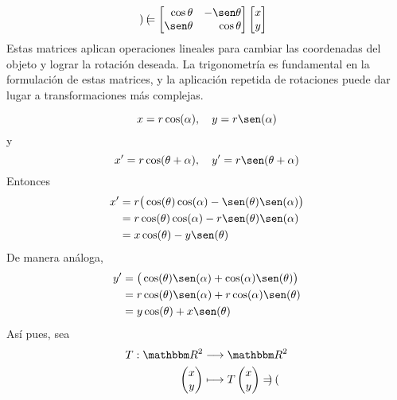 \begin{example}
{\begin{center}
{{$$\begin{pmatrix}
            \end{pmatrix} = \begin{bmatrix*}[r]
                \cos \theta & - \sen \theta \\
                \sen \theta & \cos \theta
            \end{bmatrix*} \begin{bmatrix}
                x \\
                y
            \end{bmatrix}$$
            Estas matrices aplican operaciones lineales para cambiar las coordenadas del objeto y lograr la rotación deseada. La trigonometría es fundamental en la formulación de estas matrices, y la aplicación repetida de rotaciones puede dar lugar a transformaciones más complejas.
        }}
    \end{center}
    }
    \begin{equation}
        x = r \cos(\alpha), \quad y = r \sen(\alpha)
    \end{equation}
    y
    \begin{equation}
        x' = r \cos(\theta + \alpha), \quad y' = r \sen(\theta + \alpha)
    \end{equation}
    Entonces
    \begin{align*}
        x' & = r \big( \cos(\theta) \cos(\alpha) - \sen(\theta) \sen(\alpha) \big) \\
        & = r \cos(\theta) \cos(\alpha) - r \sen(\theta) \sen(\alpha) \\
        & = x \cos(\theta) - y \sen(\theta)
    \end{align*}
    De manera análoga,
    \begin{align*}
        y' & = \big( \cos(\theta) \sen(\alpha) + \cos(\alpha) \sen(\theta) \big) \\
        & = r \cos(\theta) \sen(\alpha) + r \cos(\alpha) \sen(\theta) \\
        & = y \cos(\theta) + x \sen(\theta)
    \end{align*}
    Así pues, sea
    \begin{align*}
        T: \RR[2] & \longrightarrow \RR[2] \\
        \begin{pmatrix}
            x \\
            y
        \end{pmatrix} & \longmapsto T \begin{pmatrix}
            x \\
            y
        \end{pmatrix} = \begin{pmatrix}

\end{pmatrix}
\end{align*}
\end{example}
